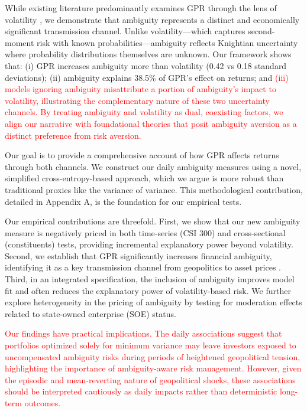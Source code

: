 \documentclass[preprint,12pt,authoryear]{elsarticle}
\begin{document}
While existing literature predominantly examines GPR through the lens of volatility \citep{Salisu2021}, we demonstrate that ambiguity represents a distinct and economically significant transmission channel. Unlike volatility---which captures second-moment risk with known probabilities---ambiguity reflects Knightian uncertainty where probability distributions themselves are unknown. Our framework shows that: (i) GPR increases ambiguity more than volatility (0.42 vs 0.18 standard deviations); (ii) ambiguity explains 38.5\% of GPR's effect on returns; and \textcolor{red}{(iii) models ignoring ambiguity misattribute a portion of ambiguity's impact to volatility, illustrating the complementary nature of these two uncertainty channels. By treating ambiguity and volatility as dual, coexisting factors, we align our narrative with foundational theories that posit ambiguity aversion as a distinct preference from risk aversion.}

Our goal is to provide a comprehensive account of how GPR affects returns through both channels. We construct our daily ambiguity measures using a novel, simplified cross-entropy-based approach, which we argue is more robust than traditional proxies like the variance of variance. This methodological contribution, detailed in Appendix A, is the foundation for our empirical tests.

Our empirical contributions are threefold. First, we show that our new ambiguity measure is negatively priced in both time-series (CSI 300) and cross-sectional (constituents) tests, providing incremental explanatory power beyond volatility. Second, we establish that GPR significantly increases financial ambiguity, identifying it as a key transmission channel from geopolitics to asset prices \citep{Caldara2022}. Third, in an integrated specification, the inclusion of ambiguity improves model fit and often reduces the explanatory power of volatility-based risk. We further explore heterogeneity in the pricing of ambiguity by testing for moderation effects related to state-owned enterprise (SOE) status.

\textcolor{red}{Our findings have practical implications. The daily associations suggest that portfolios optimized solely for minimum variance may leave investors exposed to uncompensated ambiguity risks during periods of heightened geopolitical tension, highlighting the importance of ambiguity-aware risk management. However, given the episodic and mean-reverting nature of geopolitical shocks, these associations should be interpreted cautiously as daily impacts rather than deterministic long-term outcomes.}
\end{document}
